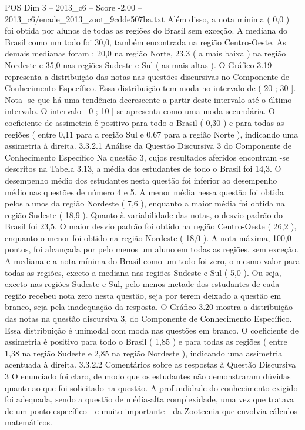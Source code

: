 \begin{textsample}{POS Dim 3 – 2013\_c6 – Score -2.00 – 2013\_c6/enade\_2013\_zoot\_9cdde507ba.txt}
Além disso, a nota mínima ( 0,0 ) foi obtida por alunos de todas as regiões do Brasil sem exceção.
A mediana do Brasil como um todo foi 30,0, também encontrada na região Centro-Oeste.
As demais medianas foram : 20,0 na região Norte, 23,3 ( a mais baixa ) na região Nordeste e 35,0 nas regiões Sudeste e Sul ( as mais altas ).
O Gráfico 3.19 representa a distribuição das notas nas questões discursivas no Componente de Conhecimento Específico.
Essa distribuição tem moda no intervalo de ( 20 ; 30 ].
Nota -se que há uma tendência decrescente a partir deste intervalo até o último intervalo.
O intervalo [ 0 ; 10 ] se apresenta como uma moda secundária.
O coeficiente de assimetria é positivo para todo o Brasil ( 0,30 ) e para todas as regiões ( entre 0,11 para a região Sul e 0,67 para a região Norte ), indicando uma assimetria à direita. 3.3.2.1 Análise da Questão Discursiva 3 do Componente de Conhecimento Específico Na questão 3, cujos resultados aferidos encontram -se descritos na Tabela 3.13, a média dos estudantes de todo o Brasil foi 14,3.
O desempenho médio dos estudantes nesta questão foi inferior ao desempenho médio nas questões de número 4 e 5.
A menor média nessa questão foi obtida pelos alunos da região Nordeste ( 7,6 ), enquanto a maior média foi obtida na região Sudeste ( 18,9 ).
Quanto à variabilidade das notas, o desvio padrão do Brasil foi 23,5.
O maior desvio padrão foi obtido na região Centro-Oeste ( 26,2 ), enquanto o menor foi obtido na região Nordeste ( 18,0 ).
A nota máxima, 100,0 pontos, foi alcançada por pelo menos um aluno em todas as regiões, sem exceção.
A mediana e a nota mínima do Brasil como um todo foi zero, o mesmo valor para todas as regiões, exceto a mediana nas regiões Sudeste e Sul ( 5,0 ).
Ou seja, exceto nas regiões Sudeste e Sul, pelo menos metade dos estudantes de cada região recebeu nota zero nesta questão, seja por terem deixado a questão em branco, seja pela inadequação da resposta.
O Gráfico 3.20 mostra a distribuição das notas na questão discursiva 3, do Componente de Conhecimento Específico.
Essa distribuição é unimodal com moda nas questões em branco.
O coeficiente de assimetria é positivo para todo o Brasil ( 1,85 ) e para todas as regiões ( entre 1,38 na região Sudeste e 2,85 na região Nordeste ), indicando uma assimetria acentuada à direita. 3.3.2.2 Comentários sobre as respostas à Questão Discursiva 3 O enunciado foi claro, de modo que os estudantes não demonstraram dúvidas quanto ao que foi solicitado na questão.
A profundidade do conhecimento exigido foi adequada, sendo a questão de média-alta complexidade, uma vez que tratava de um ponto específico - e muito importante - da Zootecnia que envolvia cálculos matemáticos.

\end{textsample}
